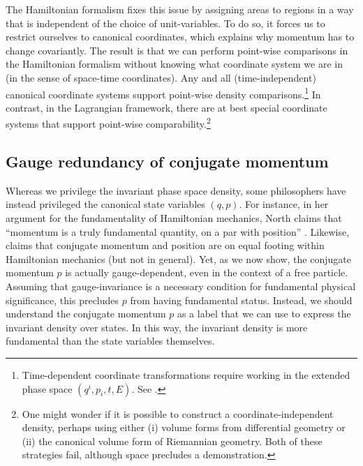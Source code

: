 \documentclass[12pt, english, twoside]{article} %
\begin{document}
The Hamiltonian formalism fixes this issue by assigning areas to regions in a way that is independent of the choice of unit-variables. To do so, it forces us to restrict ourselves to canonical coordinates, which explains why momentum has to change covariantly. The result is that we can perform point-wise comparisons in the Hamiltonian formalism without knowing what coordinate system we are in (in the sense of space-time coordinates). Any and all (time-independent) canonical coordinate systems support point-wise density comparisons.\footnote{Time-dependent coordinate transformations require working in the extended phase space $(q^i, p_i, t, E)$. See \textcites[]{Struckmeier}.} In contrast, in the Lagrangian framework, there are at best special coordinate systems that support point-wise comparability.\footnote{One might wonder if it is possible to construct a coordinate-independent density, perhaps using either (i) volume forms from differential geometry or (ii) the canonical volume form of Riemannian geometry. Both of these strategies fail, although space precludes a demonstration.}


\subsection{Gauge redundancy of conjugate momentum}
\label{gauge_momentum}

Whereas we privilege the invariant phase space density, some philosophers have instead privileged the canonical state variables $(q, p)$. For instance, in her argument for the fundamentality of Hamiltonian mechanics, North claims that ``momentum is a truly fundamental quantity, on a par with position'' \parencites*[77]{North}. Likewise, \textcites[164,171]{Wallace} claims that conjugate momentum and position are on equal footing within Hamiltonian mechanics (but not in general). Yet, as we now show, the conjugate momentum $p$ is actually gauge-dependent, even in the context of a free particle. Assuming that gauge-invariance is a necessary condition for fundamental physical significance, this precludes $p$ from having fundamental status. Instead, we should understand the conjugate momentum $p$ as a label that we can use to express the invariant density over states. In this way, the invariant density is more fundamental than the state variables themselves. 
\end{document}

